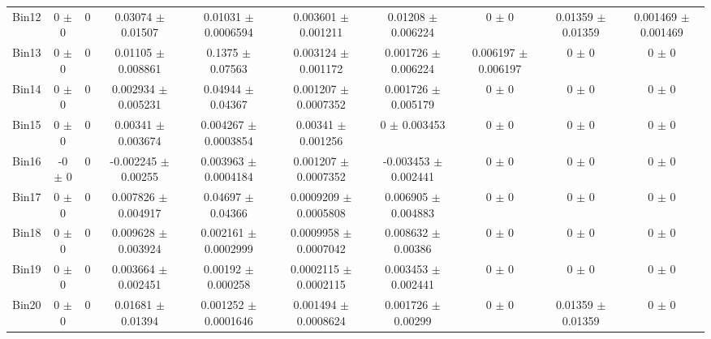 \begin{tabular}{@{\extracolsep{4pt}}lccccccccc@{}}
     Bin12 & 0 $\pm$ 0 & 0 & 0.03074 $\pm$ 0.01507 & 0.01031 $\pm$ 0.0006594 & 0.003601 $\pm$ 0.001211 & 0.01208 $\pm$ 0.006224 & 0 $\pm$ 0 & 0.01359 $\pm$ 0.01359 & 0.001469 $\pm$ 0.001469 \\ 
     Bin13 & 0 $\pm$ 0 & 0 & 0.01105 $\pm$ 0.008861 & 0.1375 $\pm$ 0.07563 & 0.003124 $\pm$ 0.001172 & 0.001726 $\pm$ 0.006224 & 0.006197 $\pm$ 0.006197 & 0 $\pm$ 0 & 0 $\pm$ 0 \\ 
     Bin14 & 0 $\pm$ 0 & 0 & 0.002934 $\pm$ 0.005231 & 0.04944 $\pm$ 0.04367 & 0.001207 $\pm$ 0.0007352 & 0.001726 $\pm$ 0.005179 & 0 $\pm$ 0 & 0 $\pm$ 0 & 0 $\pm$ 0 \\ 
     Bin15 & 0 $\pm$ 0 & 0 & 0.00341 $\pm$ 0.003674 & 0.004267 $\pm$ 0.0003854 & 0.00341 $\pm$ 0.001256 & 0 $\pm$ 0.003453 & 0 $\pm$ 0 & 0 $\pm$ 0 & 0 $\pm$ 0 \\ 
     Bin16 & -0 $\pm$ 0 & 0 & -0.002245 $\pm$ 0.00255 & 0.003963 $\pm$ 0.0004184 & 0.001207 $\pm$ 0.0007352 & -0.003453 $\pm$ 0.002441 & 0 $\pm$ 0 & 0 $\pm$ 0 & 0 $\pm$ 0 \\ 
     Bin17 & 0 $\pm$ 0 & 0 & 0.007826 $\pm$ 0.004917 & 0.04697 $\pm$ 0.04366 & 0.0009209 $\pm$ 0.0005808 & 0.006905 $\pm$ 0.004883 & 0 $\pm$ 0 & 0 $\pm$ 0 & 0 $\pm$ 0 \\ 
     Bin18 & 0 $\pm$ 0 & 0 & 0.009628 $\pm$ 0.003924 & 0.002161 $\pm$ 0.0002999 & 0.0009958 $\pm$ 0.0007042 & 0.008632 $\pm$ 0.00386 & 0 $\pm$ 0 & 0 $\pm$ 0 & 0 $\pm$ 0 \\ 
     Bin19 & 0 $\pm$ 0 & 0 & 0.003664 $\pm$ 0.002451 & 0.00192 $\pm$ 0.000258 & 0.0002115 $\pm$ 0.0002115 & 0.003453 $\pm$ 0.002441 & 0 $\pm$ 0 & 0 $\pm$ 0 & 0 $\pm$ 0 \\ 
     Bin20 & 0 $\pm$ 0 & 0 & 0.01681 $\pm$ 0.01394 & 0.001252 $\pm$ 0.0001646 & 0.001494 $\pm$ 0.0008624 & 0.001726 $\pm$ 0.00299 & 0 $\pm$ 0 & 0.01359 $\pm$ 0.01359 & 0 $\pm$ 0 \\ 
\hline\hline
  \end{tabular}
